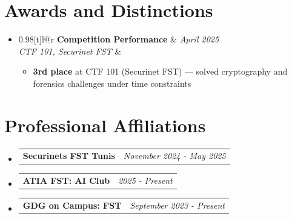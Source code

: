 \documentclass[a4paper,10pt]{article}
\makeatletter
\newcommand{\resumePOR}[3]{
\vspace{0.5mm}\item
    \begin{tabular*}{0.97\textwidth}[t]{l@{\extracolsep{\fill}}r}
        \textbf{#1}\hspace{0.3mm}#2 & \textit{\small{#3}}
    \end{tabular*}
    \vspace{-2mm}
}
\newcommand{\resumeProject}[4]{
\vspace{0.5mm}\item
    \begin{tabular*}{0.98\textwidth}[t]{l@{\extracolsep{\fill}}r}
        \textbf{#1} & \textit{\footnotesize{#3}} \\
        \footnotesize{\textit{#2}} & \footnotesize{#4}
    \end{tabular*}
    \vspace{-2.4mm}
}
\newcommand{\resumeSubHeadingListStart}{\begin{itemize}[leftmargin=*,labelsep=1mm]}
\newcommand{\resumeItemListStart}{\begin{itemize}[leftmargin=*,labelsep=1mm,itemsep=0.5mm]}
\newcommand{\resumeSubHeadingListEnd}{\end{itemize}\vspace{2mm}}
\newcommand{\resumeItemListEnd}{\end{itemize}\vspace{-2mm}}
\makeatother
\begin{document}
\section{\textbf{Awards and Distinctions}}
\vspace{-0.4mm}
\resumeSubHeadingListStart
\resumeProject
  {Competition Performance}
  {CTF 101, Securinet FST}
  {April 2025}
  {{}\href{https://www.linkedin.com/posts/fares-dkhili-018b17303_cybersecurity-ctf-activity-7322699787982528512-YMcf?utm_source=share&utm_medium=member_desktop&rcm=ACoAAE2V9FQBl97M7EPoPtI-0a16X0hT_ahlsmk}{\textcolor{darkblue}{\faIcon{globe}}}}
\resumeItemListStart
  \item \textbf{3rd place} at CTF 101 (Securinet FST) — solved cryptography and forensics challenges under time constraints
\resumeItemListEnd
\resumeSubHeadingListEnd

\vspace{-6mm}
\section{\textbf{Professional Affiliations}}
\vspace{-0.4mm}
\resumeSubHeadingListStart
\resumePOR{Securinets FST Tunis}
    {}
    {November 2024 - May 2025}
\resumePOR{ATIA FST: AI Club}
    {}
    {2025 - Present}
\resumePOR{GDG on Campus: FST}
    {}
    {September 2023 - Present}
\resumeSubHeadingListEnd
\vspace{-6mm}
\end{document}
